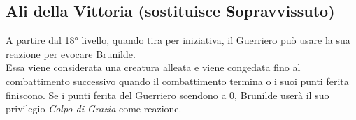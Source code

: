 \subsection{Ali della Vittoria (sostituisce Sopravvissuto)}
A partire dal 18° livello, quando tira per iniziativa, il Guerriero può usare la sua reazione per evocare Brunilde. \\ Essa viene considerata una creatura alleata e viene congedata fino al combattimento successivo quando il combattimento termina o i suoi punti ferita finiscono. Se i punti ferita del Guerriero scendono a 0, Brunilde userà il suo privilegio \textit{Colpo di Grazia} come reazione.

